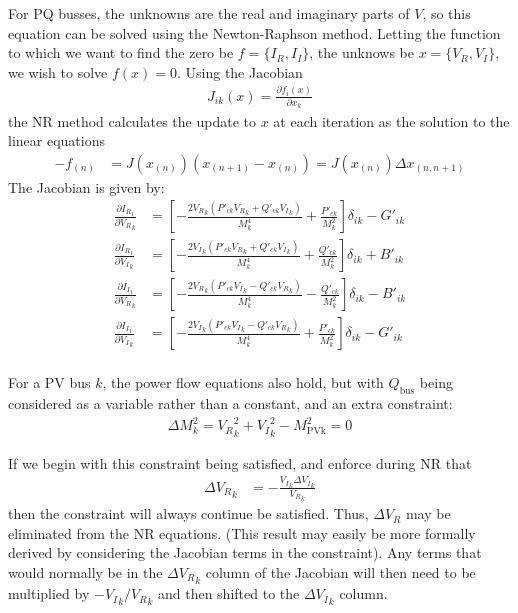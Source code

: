 \documentclass[11pt]{article}
\newcommand{\re}[1]{{{#1}_R}}
\newcommand{\im}[1]{{{#1}_I}}
\begin{document}
For PQ busses, the unknowns are the real and imaginary parts of $V$, so this equation can be solved using the Newton-Raphson method. Letting the function to which we want to find the zero be $f = \{\re{I}, \im{I}\}$, the unknows be $x = \{\re{V}, \im{V}\}$, we wish to solve $f(x) = 0$. Using the Jacobian
\begin{align}
J_{ik}(x) = \frac{\partial f_i(x)}{\partial x_k}
\end{align}
the NR method calculates the update to $x$ at each iteration as the solution to the linear equations
\begin{align}
-f_{(n)} &= J(x_{(n)})(x_{(n+1)}-x_{(n)}) = J(x_{(n)})\Delta x_{(n,n+1)}
\end{align}
The Jacobian is given by:
\begin{align}
\frac{\partial \re{I}_i}{\partial \re{V}_{k}} &= \left[-\frac{2\re{V}_k(P'_{ck}\re{V}_k + Q'_{ck}\im{V}_k)}{M_k^4} + \frac{P'_{ck}}{M_k^2} \right]\delta_{ik} - G'_{ik} \\
\frac{\partial \re{I}_i}{\partial \im{V}_{k}} &= \left[-\frac{2\im{V}_k(P'_{ck}\re{V}_k + Q'_{ck}\im{V}_k)}{M_k^4} + \frac{Q'_{ck}}{M_k^2} \right]\delta_{ik}  + B'_{ik} \\
\frac{\partial \im{I}_i}{\partial \re{V}_{k}} &= \left[-\frac{2\re{V}_k(P'_{ck}\im{V}_k - Q'_{ck}\re{V}_k)}{M_k^4} - \frac{Q'_{ck}}{M_k^2} \right]\delta_{ik}  - B'_{ik} \\
\frac{\partial \im{I}_i}{\partial \im{V}_{k}} &= \left[-\frac{2\im{V}_k(P'_{ck}\im{V}_k - Q'_{ck}\re{V}_k)}{M_k^4} + \frac{P'_{ck}}{M_k^2} \right] \delta_{ik} - G'_{ik} \\
\end{align}

For a PV bus $k$, the power flow equations also hold, but with $Q_{\text{bus}}$ being considered as a variable rather than a constant, and an extra constraint:
\begin{align}
\Delta M^2_k = \re{V}_{k}^2 + \im{V}_k^2 - M^2_{\text{PVk}} = 0
\end{align}

If we begin with this constraint being satisfied, and enforce during NR that
\begin{align}
\re{\Delta V}_k &= -\frac{\im{V}_k\im{\Delta V}_k}{\re{V}_k}
\end{align}
then the constraint will always continue be satisfied. Thus, $\re{\Delta V}$ may be eliminated from the NR equations. (This result may easily be more formally derived by considering the Jacobian terms in the constraint). Any terms that would normally be in the $\re{\Delta V}_k$ column of the Jacobian will then need to be multiplied by $-\im{V}_k/\re{V}_k$ and then shifted to the $\im{\Delta V}_k$ column.
\end{document}
